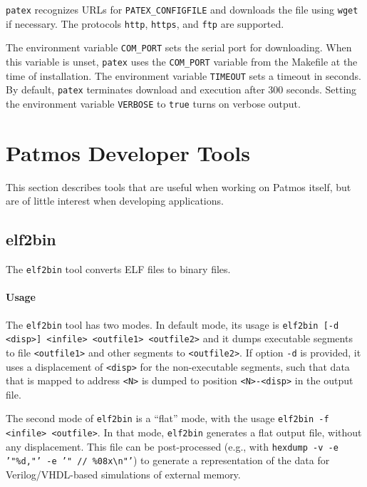 \documentclass[a4paper,fontsize=10pt,twoside,DIV15,BCOR12mm,headinclude=true,footinclude=false,pagesize,bibtotoc]{scrbook}
\begin{document}
\texttt{patex} recognizes URLs for \texttt{PATEX\_CONFIGFILE} and
downloads the file using \texttt{wget} if necessary. The protocols
\texttt{http}, \texttt{https}, and \texttt{ftp} are supported.

The environment variable \texttt{COM\_PORT} sets the serial port for
downloading. When this variable is unset, \texttt{patex} uses the
\texttt{COM\_PORT} variable from the Makefile at the time of
installation. The environment variable \texttt{TIMEOUT} sets a timeout
in seconds. By default, \texttt{patex} terminates download and
execution after 300 seconds. Setting the environment variable
\texttt{VERBOSE} to \texttt{true} turns on verbose output.

\section{Patmos Developer Tools}

This section describes tools that are useful when working on Patmos
itself, but are of little interest when developing applications.

\subsection{elf2bin}

The \texttt{elf2bin} tool converts ELF files to binary files.

\paragraph{Usage}

The \texttt{elf2bin} tool has two modes. In default mode, its usage is
\texttt{elf2bin [-d <disp>] <infile> <outfile1> <outfile2>} and it
dumps executable segments to file \texttt{<outfile1>} and other
segments to \texttt{<outfile2>}. If option \texttt{-d} is provided, it
uses a displacement of \texttt{<disp>} for the non-executable
segments, such that data that is mapped to address \texttt{<N>} is
dumped to position \texttt{<N>-<disp>} in the output file.

The second mode of \texttt{elf2bin} is a ``flat'' mode, with the usage
\texttt{elf2bin -f <infile> <outfile>}. In that mode, \texttt{elf2bin}
generates a flat output file, without any displacement. This file can
be post-processed (e.g., with \texttt{hexdump -v -e '"\%d,"' -e '" // \%08x\textbackslash n"'})
to generate a representation of the data for Verilog/VHDL-based
simulations of external memory.
\end{document}
